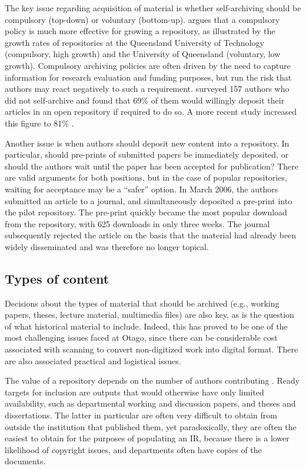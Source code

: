 \documentclass[12pt,pdftex,a4paper,titlepage]{article}
\begin{document}
The key issue regarding acquisition of material is whether self-archiving should be compulsory (top-down) or voluntary (bottom-up).  \citeyear{Sale-A-2005-NZIRW,Sale-A-2006-OAchapter} argues that a compulsory policy is much more effective for growing a repository, as illustrated by the growth rates of repositories at the Queensland University of Technology (compulsory, high growth) and the University of Queensland (voluntary, low growth). Compulsory archiving policies are often driven by the need to capture information for research evaluation and funding purposes, but run the risk that authors may react negatively to such a requirement.  surveyed 157 authors who did not self-archive and found that 69\% of them would willingly deposit their articles in an open repository if required to do so. A more recent study increased this figure to 81\% \cite{Swan-A-2006-OAchapter}.

Another issue is when authors should deposit new content into a repository. In particular, should pre-prints of submitted papers be immediately deposited, or should the authors wait until the paper has been accepted for publication? There are valid arguments for both positions, but in the case of popular repositories, waiting for acceptance may be a ``safer'' option. In March 2006, the authors submitted an article to a journal, and simultaneously deposited a pre-print \cite{Stan-N-2006-running} into the pilot repository. The pre-print quickly became the most popular download from the repository, with 625 downloads in only three weeks. The journal subsequently rejected the article on the basis that the material had already been widely disseminated and was therefore no longer topical.


\subsection{Types of content}

Decisions about the types of material that should be archived (e.g., working papers, theses, lecture material, multimedia files) are also key, as is the question of what historical material to include. Indeed, this has proved to be one of the most challenging issues faced at Otago, since there can be considerable cost associated with scanning to convert non-digitized work into digital format. There are also associated practical and logistical issues.

The value of a repository depends on the number of authors contributing \cite{Rank-J-2005-feasibility}. Ready targets for inclusion are outputs that would otherwise have only limited availability, such as departmental working and discussion papers, and theses and dissertations. The latter in particular are often very difficult to obtain from outside the institution that published them, yet paradoxically, they are often the easiest to obtain for the purposes of populating an IR, because there is a lower likelihood of copyright issues, and departments often have copies of the documents.
\end{document}

